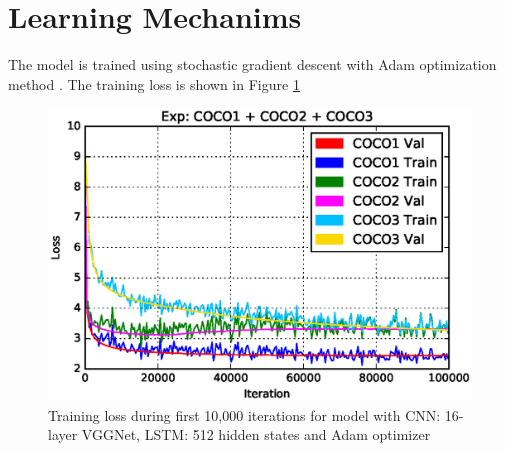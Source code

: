 \section{Learning Mechanims}
The model is trained using stochastic gradient descent with Adam optimization method \cite{DBLP:journals/corr/KingmaB14}. The training loss is shown in Figure \ref{fig:vgg_adam}

\begin{figure}
  \label{fig:vgg_adam}
  \centering
  \includegraphics[width=0.8\linewidth]{Chapters/Fig/coco1_coco2_coco3_loss.eps}
  \caption{Training loss during first 10,000 iterations for model with CNN: 16-layer VGGNet, LSTM: 512 hidden states and Adam optimizer}
\end{figure}

\nocite{MLOxford}